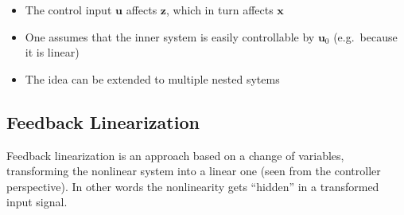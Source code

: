 \newpar{}

\begin{itemize}
    \item The control input $\mathbf{u}$ affects $\mathbf{z}$, which in turn affects $\mathbf{x}$
    \item One assumes that the inner system is easily controllable by $\mathbf{u}_0$ (e.g.\ because it is linear)
    \item The idea can be extended to multiple nested sytems
\end{itemize}

\subsection{Feedback Linearization}
Feedback linearization is an approach based on a change of variables, transforming the nonlinear system into a linear one (seen from the controller perspective). In other words the nonlinearity gets ``hidden'' in a transformed input signal.

